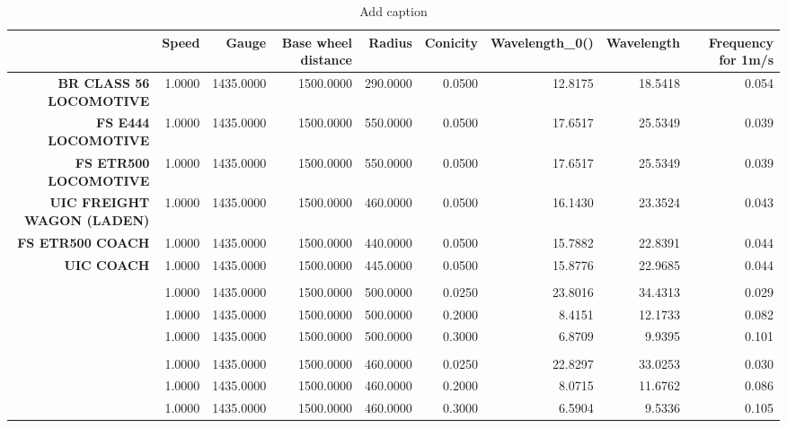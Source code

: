 \begin{table}[htbp]
  \centering
  \caption{Add caption}
    \begin{tabular}{rrrrrrrrr}
    \toprule
    \textbf{} & \textbf{Speed} & \textbf{Gauge} & \textbf{Base wheel distance} & \textbf{Radius} & \textbf{Conicity} & \textbf{Wavelength\_0()} & \textbf{Wavelength} & \textbf{Frequency for 1m/s} \\
    \midrule
    \textbf{BR CLASS 56 LOCOMOTIVE} & 1.0000 & 1435.0000 & 1500.0000 & 290.0000 & 0.0500 & 12.8175 & 18.5418 & 0.054 \\
    \textbf{FS E444 LOCOMOTIVE} & 1.0000 & 1435.0000 & 1500.0000 & 550.0000 & 0.0500 & 17.6517 & 25.5349 & 0.039 \\
    \textbf{FS ETR500 LOCOMOTIVE} & 1.0000 & 1435.0000 & 1500.0000 & 550.0000 & 0.0500 & 17.6517 & 25.5349 & 0.039 \\
    \textbf{UIC FREIGHT WAGON (LADEN)} & 1.0000 & 1435.0000 & 1500.0000 & 460.0000 & 0.0500 & 16.1430 & 23.3524 & 0.043 \\
    \textbf{FS ETR500 COACH} & 1.0000 & 1435.0000 & 1500.0000 & 440.0000 & 0.0500 & 15.7882 & 22.8391 & 0.044 \\
    \textbf{UIC COACH} & 1.0000 & 1435.0000 & 1500.0000 & 445.0000 & 0.0500 & 15.8776 & 22.9685 & 0.044 \\
    \textbf{} &       &       &       &       &       &       &       &  \\
    \textbf{} & 1.0000 & 1435.0000 & 1500.0000 & 500.0000 & 0.0250 & 23.8016 & 34.4313 & 0.029 \\
    \textbf{} & 1.0000 & 1435.0000 & 1500.0000 & 500.0000 & 0.2000 & 8.4151 & 12.1733 & 0.082 \\
    \textbf{} & 1.0000 & 1435.0000 & 1500.0000 & 500.0000 & 0.3000 & 6.8709 & 9.9395 & 0.101 \\
    \textbf{} &       &       &       &       &       &       &       &  \\
    \textbf{} & 1.0000 & 1435.0000 & 1500.0000 & 460.0000 & 0.0250 & 22.8297 & 33.0253 & 0.030 \\
    \textbf{} & 1.0000 & 1435.0000 & 1500.0000 & 460.0000 & 0.2000 & 8.0715 & 11.6762 & 0.086 \\
    \textbf{} & 1.0000 & 1435.0000 & 1500.0000 & 460.0000 & 0.3000 & 6.5904 & 9.5336 & 0.105 \\
    \bottomrule
    \end{tabular}%
  \label{tab:addlabel}%
\end{table}%




